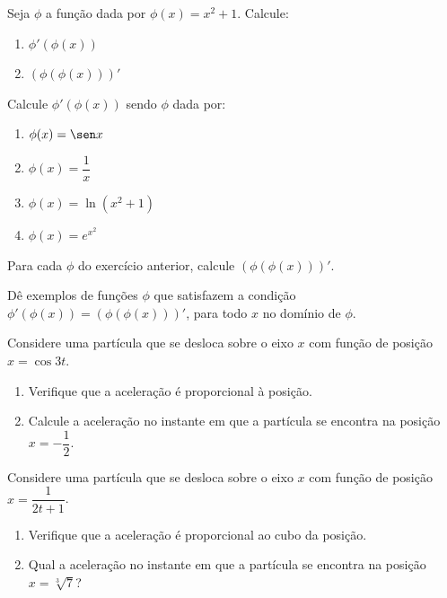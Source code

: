 \begin{exercicio}[21]
Seja $\phi$ a função dada por $\phi(x) = x^2 + 1$. Calcule:
\begin{enumerate}[label=\alph*)]
    \item $\phi'(\phi(x))$
    \item $(\phi(\phi(x)))'$
\end{enumerate}
\end{exercicio}

\begin{exercicio}[22]
Calcule $\phi'(\phi(x))$ sendo $\phi$ dada por:
\begin{enumerate}[label=\alph*)]
    \item $\phi(x) = \sen x$
    \item $\phi(x) = \dfrac{1}{x}$
    \item $\phi(x) = \ln(x^2 + 1)$
    \item $\phi(x) = e^{x^2}$
\end{enumerate}
\end{exercicio}

\begin{exercicio}[23]
Para cada $\phi$ do exercício anterior, calcule $(\phi(\phi(x)))'$.
\end{exercicio}

\begin{exercicio}[24]
Dê exemplos de funções $\phi$ que satisfazem a condição $\phi'(\phi(x)) = (\phi(\phi(x)))'$, para todo $x$ no domínio de $\phi$.
\end{exercicio}

\begin{exercicio}[25]
Considere uma partícula que se desloca sobre o eixo $x$ com função de posição $x = \cos 3t$.
\begin{enumerate}[label=\alph*)]
    \item Verifique que a aceleração é proporcional à posição.
    \item Calcule a aceleração no instante em que a partícula se encontra na posição $x = -\dfrac{1}{2}$.
\end{enumerate}
\end{exercicio}

\begin{exercicio}[26]
Considere uma partícula que se desloca sobre o eixo $x$ com função de posição $x = \dfrac{1}{2t + 1}$.
\begin{enumerate}[label=\alph*)]
    \item Verifique que a aceleração é proporcional ao cubo da posição.
    \item Qual a aceleração no instante em que a partícula se encontra na posição $x = \sqrt[3]{7}$?
\end{enumerate}
\end{exercicio}

